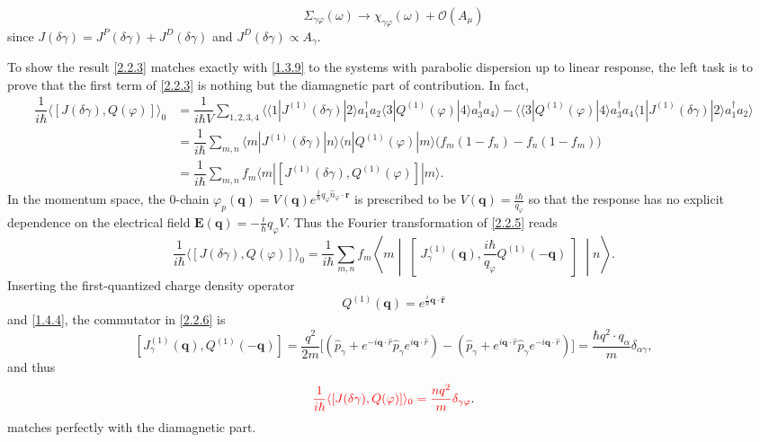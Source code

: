 \documentclass[10pt,nofootinbib,letterpaper]{revtex4}
\begin{document}
		\begin{equation*}
			\Sigma_{\gamma\varphi}(\omega)\rightarrow \chi_{\gamma\varphi}(\omega)+\mathcal{O}(A_\mu)
		\end{equation*}
		since $J(\delta\gamma)=J^P(\delta\gamma)+J^D(\delta\gamma)$ and $J^D(\delta\gamma)\propto A_\gamma$.\par
		To show the result \eqref{2.2.3} matches exactly with \eqref{1.3.9} to the systems with parabolic dispersion up to linear response, the left task is to prove that the first term of \eqref{2.2.3} is nothing but the diamagnetic part of contribution. In fact,
		\begin{align}
			\dfrac{1}{i\hbar}\langle[J(\delta\gamma),Q(\varphi)]\rangle_0&=\dfrac{1}{i\hbar V}\sum_{1,2,3,4}\bigg\langle\langle1|J^{(1)}(\delta\gamma)|2\rangle a_1^\dagger a_2\langle 3|Q^{(1)}(\varphi)|4\rangle a_3^\dagger a_4\bigg\rangle-\bigg\langle\langle3|Q^{(1)}(\varphi)|4\rangle a_3^\dagger a_4\langle 1|J^{(1)}(\delta\gamma)|2\rangle a_1^\dagger a_2\bigg\rangle\nonumber\\
			&=\dfrac{1}{i\hbar}\sum_{m,n}\langle m|J^{(1)}(\delta\gamma)|n\rangle\langle n|Q^{(1)}(\varphi)|m\rangle\big(f_m(1-f_n)-f_n(1-f_m)\big)\nonumber\\
			&=\dfrac{1}{i\hbar}\sum_{m,n}f_m\langle m|[J^{(1)}(\delta\gamma),Q^{(1)}(\varphi)]|m\rangle.\label{2.2.5}
		\end{align}
		In the momentum space, the $0$-chain $\varphi_p(\bm{q})=V(\bm{q})e^{\frac i\hbar q_\varphi\hat n_\varphi\cdot\bm{r}}$ is prescribed to be $V(\bm{q})=\frac{i\hbar}{q_\varphi}$ so that the response has no explicit dependence on the electrical field $\bm{E}(\bm{q})=-\frac i\hbar q_\varphi V$. Thus the Fourier transformation of \eqref{2.2.5} reads
		\begin{equation}\label{2.2.6}
			\dfrac{1}{i\hbar}\langle[J(\delta\gamma),Q(\varphi)]\rangle_0=\dfrac{1}{i\hbar}\sum_{m,n}f_m\left\langle m\middle|\middle[J^{(1)}_\gamma(\bm{q}),\dfrac{i\hbar}{q_\varphi}Q^{(1)}(-\bm{q})\middle]\middle|n\right\rangle.
		\end{equation}
		Inserting the first-quantized charge density operator
		\begin{equation}\label{2.2.5}
			Q^{(1)}(\bm{q})=e^{\frac i\hbar\bm{q}\cdot\hat{\bm{r}}}
		\end{equation}
		and \eqref{1.4.4}, the commutator in \eqref{2.2.6} is
		\begin{equation}\label{2.2.6}
			[J^{(1)}_\gamma(\bm{q}),Q^{(1)}(-\bm{q})]=\dfrac{q^2}{2m}\bigg[(\hat{p}_\gamma+e^{-i\bm{q}\cdot\hat{r}}\hat p_\gamma e^{i\bm{q}\cdot\hat{r}})-(\hat{p}_\gamma+e^{i\bm{q}\cdot\hat{r}}\hat p_\gamma e^{-i\bm{q}\cdot\hat{r}})\bigg]=\dfrac{\hbar q^2\cdot q_\alpha}{m}\delta_{\alpha\gamma},
		\end{equation}
		and thus
		\begin{equation}\label{2.2.7}
			{\color{red}\dfrac{1}{i\hbar}\langle[J(\delta\gamma),Q(\varphi)]\rangle_0=\dfrac{nq^2}{m}\delta_{\gamma\varphi}}.
		\end{equation}
		matches perfectly with the diamagnetic part.
\end{document}
